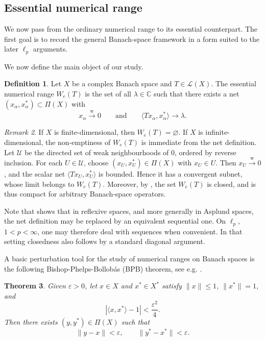 \documentclass[11pt]{amsart}
\numberwithin{equation}{section}
\newtheorem{theorem}{Theorem}[section]
\theoremstyle{definition}
\newtheorem{definition}[theorem]{Definition}
\theoremstyle{remark}
\newtheorem{remark}[theorem]{Remark}
\newcommand{\C}{\mathbb{C}}
\newcommand{\ip}[2]{\langle #1,#2\rangle}
\newcommand{\e}{\varepsilon}
\newcommand{\We}{W_e}
\newcommand{\wto}{\xrightarrow{\mathrm w}}
\begin{document}
\subsection{Essential numerical range}\label{subsec:banach-essential-numerical-range}

We now pass from the ordinary numerical range to its essential counterpart. 
The first goal is to record the general Banach-space framework in a form suited to the later $\ell_p$ arguments.


We now define the main object of our study.
\begin{definition}
Let $X$ be a complex Banach space and $T\in \mathcal L(X)$. The essential numerical range $\We(T)$ is the set of all $\lambda\in\C$ such that there exists a net $(x_\alpha,x^*_\alpha)\subset\Pi(X)$ with
\[
x_\alpha\wto 0
\qquad\text{and}\qquad
\ip{Tx_\alpha}{x^*_\alpha}\to\lambda.
\]
\end{definition}

\begin{remark}\label{remark17}
If \(X\) is finite-dimensional, then \(W_e(T)=\varnothing\). If \(X\) is infinite-dimensional, the non-emptiness of \(W_e(T)\) is immediate from the net definition. Let $\mathcal U$ be the directed set of weak neighbourhoods of $0$, ordered by reverse inclusion. For each $U\in\mathcal U$, choose $(x_U,x_U^*)\in\Pi(X)$ with $x_U\in U$. Then $x_U\wto 0$, and the scalar net $\ip{Tx_U}{x_U^*}$ is bounded. Hence it has a convergent subnet, whose limit belongs to $\We(T)$.
Moreover,  by \cite[Proposition~5]{BM}, the set $\We(T)$ is closed, and is thus compact for arbitrary Banach-space operators.
\end{remark}

Note that \cite[Theorems~11 and~13]{BM} shows that in reflexive spaces, and more generally in Asplund spaces, the net definition may be replaced by an equivalent sequential one. 
On $\ell_p,$ $1<p<\infty$, one may therefore deal with sequences when convenient. In that setting closedness also follows by a standard diagonal argument.

A basic perturbation tool for the study of numerical ranges on Banach spaces is the following Bishop-Phelps-Bollob\'as (BPB) theorem, see e.g. \cite[Theorem 16.1]{BD2}.

\begin{theorem}\label{thm:bpb}
Given $\e>0$, let $x\in X$ and  $x^*\in X^*$ satisfy $\|x\|\le 1$, $\|x^*\|=1$, and
\[
|\ip{x}{x^*}-1|<\frac{\e^2}{4}.
\]
Then there exists $(y,y^*)\in\Pi(X)$ such that
\[
\|y-x\|<\e,
\qquad
\|y^*-x^*\|<\e.
\]
\end{theorem}
\end{document}
